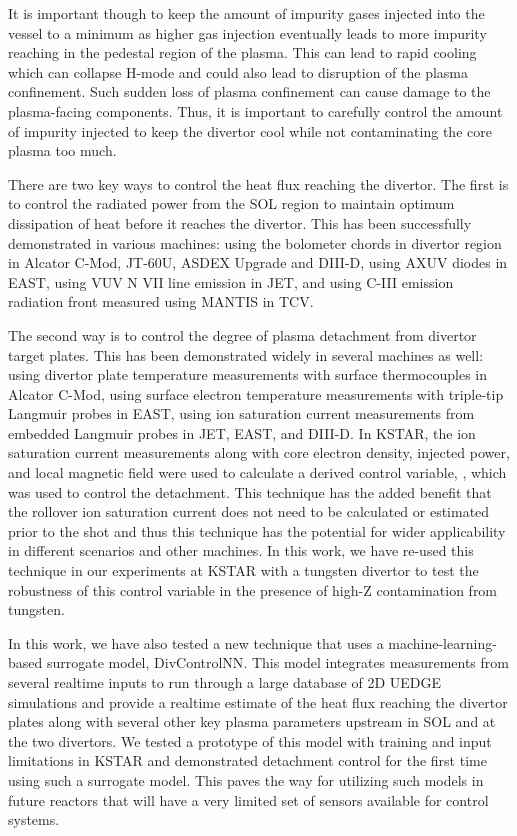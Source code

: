 It is important though to keep the amount of impurity gases injected into the vessel to a minimum as higher gas injection eventually leads to more impurity reaching in the pedestal region of the plasma.
This can lead to rapid cooling which can collapse H-mode and could also lead to disruption of the plasma confinement.
Such sudden loss of plasma confinement can cause damage to the plasma-facing components.
Thus, it is important to carefully control the amount of impurity injected to keep the divertor cool while not contaminating the core plasma too much.

There are two key ways to control the heat flux reaching the divertor.
The first is to control the radiated power from the \ac{SOL} region to maintain optimum dissipation of heat before it reaches the divertor.
This has been successfully demonstrated in various machines:
using the bolometer chords in divertor region in Alcator C-Mod\cite{Goetz_1999_POP}, JT-60U\cite{Asakura_2009_NF}, ASDEX Upgrade\cite{Kallenbach_2012_NF} and DIII-D\cite{Eldon_2019_NME},
using AXUV diodes in EAST\cite{Wu_2018_NF},
using VUV N VII line emission in JET\cite{Maddison_2011_NF}, and
using C-III emission radiation front measured using MANTIS in TCV\cite{Ravensbergen_2021_NC}.

The second way is to control the degree of plasma detachment from divertor target plates.
This has been demonstrated widely in several machines as well:
using divertor plate temperature measurements with surface thermocouples in Alcator C-Mod\cite{Brunner_2017_NF},
using surface electron temperature measurements with triple-tip Langmuir probes in EAST\cite{Eldon_2021_NME},
using ion saturation current measurements from embedded Langmuir probes in JET\cite{Guillemaut_2017_PPCF}, EAST\cite{Yuan_2020_FED}, and DIII-D\cite{Eldon_2021_NME}.
In KSTAR, the ion saturation current measurements along with core electron density, injected power, and local magnetic field were used to calculate a derived control variable, \Afrac, which was used to control the detachment\cite{Eldon_2022_PPCF}.
This technique has the added benefit that the rollover ion saturation current does not need to be calculated or estimated prior to the shot and thus this technique has the potential for wider applicability in different scenarios and other machines.
In this work, we have re-used this technique in our experiments at KSTAR with a tungsten divertor to test the robustness of this control variable in the presence of high-Z contamination from tungsten.

In this work, we have also tested a new technique that uses a machine-learning-based surrogate model, DivControlNN\cite{Zhu_2025_InPrep}.
This model integrates measurements from several realtime inputs to run through a large database of 2D UEDGE\cite{Rognlien_1999} simulations and provide a realtime estimate of the heat flux reaching the divertor plates along with several other key plasma parameters upstream in \ac{SOL} and at the two divertors.
We tested a prototype of this model with training and input limitations in KSTAR and demonstrated detachment control for the first time using such a surrogate model.
This paves the way for utilizing such models in future reactors that will have a very limited set of sensors available for control systems.

